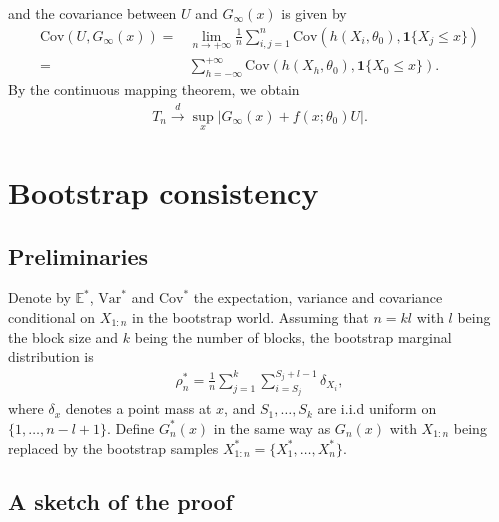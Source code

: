 \documentclass[11pt]{article}
\begin{document}
and the covariance between $U$ and $G_{\infty}(x)$ is given by
\begin{align*}
\text{Cov}(U,G_\infty(x))=&\lim_{n\rightarrow+\infty}
\frac{1}{n}\sum^{n}_{i,j=1}\text{Cov}(h(X_i,\theta_0),\mathbf{1}\{X_j\leq x\})
\\=&\sum^{+\infty}_{h=-\infty}\text{Cov}(h(X_{h},\theta_0),\mathbf{1}\{X_0\leq x\}).
\end{align*}
By the continuous mapping theorem, we obtain
\begin{align*}
T_n \overset{d}{\rightarrow} \sup_x |G_{\infty}(x)+f(x;\theta_0)U|.    
\end{align*}



\section{Bootstrap consistency}
\subsection{Preliminaries}
Denote by $\mathbb{E}^*$, $\text{Var}^*$ and $\text{Cov}^*$
the expectation, variance and covariance conditional on $X_{1:n}$ in the bootstrap world. Assuming that $n=kl$ with $l$ being the block size and $k$ being the number of blocks, the bootstrap marginal distribution is 
\begin{align*}
\rho_n^*=\frac{1}{n}\sum^{k}_{j=1}\sum^{S_j+l-1}_{i=S_j} \delta_{X_i},    
\end{align*}
where $\delta_x$ denotes a point mass at $x$, and $S_1,\dots,S_k$ are i.i.d uniform on $\{1,\dots,n-l+1\}$. 
Define $G_n^*(x)$ in the same way as $G_n(x)$ with $X_{1:n}$ being replaced by the bootstrap samples $X_{1:n}^*=\{X_1^*,\dots,X_n^*\}$.

\subsection{A sketch of the proof}
\end{document}
